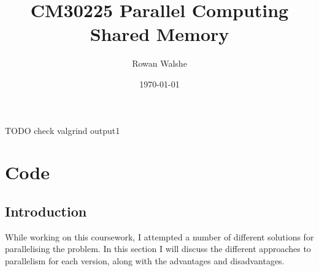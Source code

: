 \documentclass{report}
\title{CM30225 Parallel Computing\\Shared Memory} %
\author{Rowan Walshe} %
\date{\today} %
\begin{document}
\maketitle %
TODO check valgrind output1
\pagebreak

\chapter{Code}
\section{Introduction}
While working on this coursework, I attempted a number of different solutions for parallelising the problem. In this section I will discuss the different approaches to parallelism for each version, along with the advantages and disadvantages.
\end{document}

